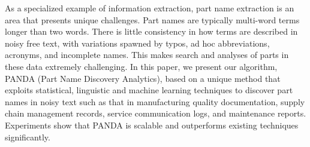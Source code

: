 As a specialized example of information extraction, part name extraction is an area that presents unique challenges. Part names are typically multi-word terms longer than two words. There is little consistency in how terms are described in noisy free text, with variations spawned by typos, ad hoc abbreviations, acronyms, and incomplete names. This makes search and analyses of parts in these data extremely challenging. In this paper, we present our algorithm, PANDA (Part Name Discovery Analytics), based on a unique method that exploits statistical, linguistic and machine learning techniques to discover part names in noisy text such as that in manufacturing quality documentation, supply chain management records, service communication logs, and maintenance reports. Experiments show that PANDA is scalable and outperforms existing techniques significantly.
